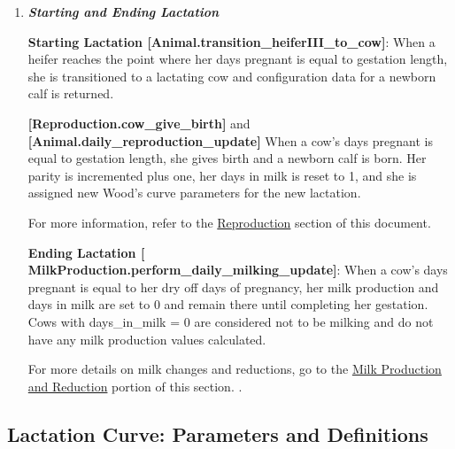 \documentclass{article}
\begin{document}
\begin{refsection}
\begin{enumerate}
        \item \textbf{\textit{Starting and Ending Lactation}} 
        \vspace{0.1cm}
    
    \textbf{Starting Lactation [Animal.transition\_heiferIII\_to\_cow]}: When a heifer reaches the point where her days pregnant is equal to gestation length, she is transitioned to a lactating cow and configuration data for a newborn calf is returned. 
    
    
    \textbf{[Reproduction.cow\_give\_birth]} and \textbf{[Animal.daily\_reproduction\_update]} When a cow’s days pregnant is equal to gestation length, she gives birth and a newborn calf is born. Her parity is incremented plus one, her days in milk is reset to 1, and she is assigned new Wood’s curve parameters for the new lactation. 
    \vspace{0.5cm}




        \begin{tcolorbox}[colback=white, colframe=black, boxrule=0.5pt, arc=3pt, width=\textwidth]
            For more information, refer to the \hyperref[REPRO]{Reproduction} section of this document.
        \end{tcolorbox}
        \vspace{0.2cm}
    
    \textbf{Ending Lactation [ MilkProduction.perform\_daily\_milking\_update]}: When a cow’s days pregnant is equal to her dry off days of pregnancy, her milk production and days in milk are set to 0 and remain there until completing her gestation. Cows with days\_in\_milk = 0 are considered not to be milking and do not have any milk production values calculated. 
    \vspace{0.2cm}
            
        \begin{tcolorbox}[colback=white, colframe=black, boxrule=0.5pt, arc=3pt, width=\textwidth]
            For more details on milk changes and reductions, go to the \hyperref[myprodred]{Milk Production and Reduction} portion of this section. . 
        \end{tcolorbox}
    
   
    \end{enumerate}

 
\subsection{Lactation Curve: Parameters and Definitions} \label{lactcurve}
 

\end{refsection}
\end{document}
